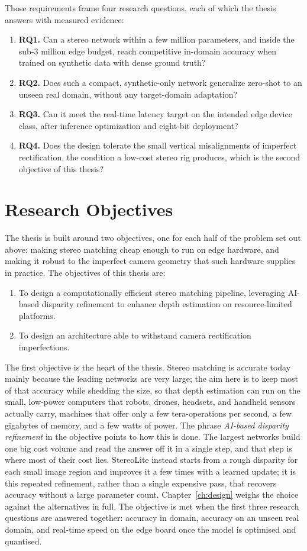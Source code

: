 Those requirements frame four research questions, each of which the thesis
answers with measured evidence:
\begin{enumerate}
\item \textbf{RQ1.} Can a stereo network within a few million parameters,
and inside the sub-3 million edge budget, reach competitive in-domain
accuracy when trained on synthetic data with dense ground truth?
\item \textbf{RQ2.} Does such a compact, synthetic-only network generalize
zero-shot to an unseen real domain, without any target-domain adaptation?
\item \textbf{RQ3.} Can it meet the real-time latency target on the intended
edge device class, after inference optimization and eight-bit deployment?
\item \textbf{RQ4.} Does the design tolerate the small vertical
misalignments of imperfect rectification, the condition a low-cost
stereo rig produces, which is the second objective of this thesis?
\end{enumerate}

\FloatBarrier
\section{Research Objectives}
The thesis is built around two objectives, one for each half of the
problem set out above: making stereo matching cheap enough to run on
edge hardware, and making it robust to the imperfect camera geometry
that such hardware supplies in practice. The objectives of this thesis
are:
\begin{enumerate}
\item To design a computationally efficient stereo matching pipeline,
leveraging AI-based disparity refinement to enhance depth estimation on
resource-limited platforms.
\item To design an architecture able to withstand camera rectification
imperfections.
\end{enumerate}

The first objective is the heart of the thesis. Stereo matching is
accurate today mainly because the leading networks are very large; the
aim here is to keep most of that accuracy while shedding the size, so
that depth estimation can run on the small, low-power computers that
robots, drones, headsets, and handheld sensors actually carry, machines
that offer only a few tera-operations per second, a few gigabytes of
memory, and a few watts of power. The phrase \emph{AI-based disparity
refinement} in the objective points to how this is done. The largest
networks build one big cost volume and read the answer off it in a
single step, and that step is where most of their cost lies. StereoLite
instead starts from a rough disparity for each small image region and
improves it a few times with a learned update; it is this repeated
refinement, rather than a single expensive pass, that recovers accuracy
without a large parameter count. Chapter~\ref{ch:design} weighs the
choice against the alternatives in full. The objective is met when the
first three research questions are answered together: accuracy in
domain, accuracy on an unseen real domain, and real-time speed on the
edge board once the model is optimised and quantised.

